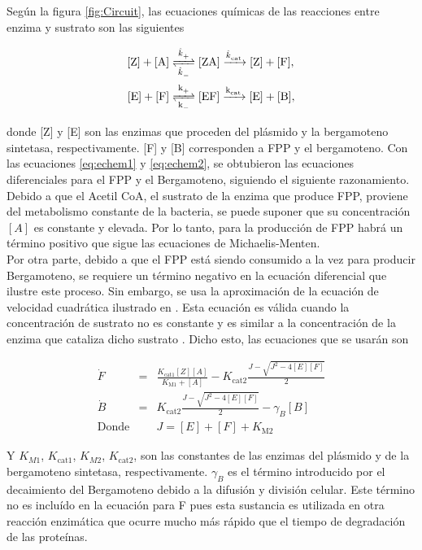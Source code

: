 \documentclass[12pt]{article}
\begin{document}
Seg\'un la figura \ref{fig:Circuit}, las ecuaciones qu\'imicas de las reacciones entre enzima y sustrato son las siguientes

\begin{align}
\ce{[Z] + [A]} &\ce{<=>[\ce{\hat{k}_+}][\ce{\hat{k}_-}] [ZA] ->[\ce{\hat{k}_{cat}}] [Z] + [F]}, \label{eq:echem1}\\
\ce{[E] + [F]} &\ce{<=>[\ce{k_+}][\ce{k_-}] [EF] ->[\ce{k_{cat}}] [E] + [B]}, \label{eq:echem2}
\end{align}

donde [Z] y [E] son las enzimas que proceden del pl\'asmido y la bergamoteno sintetasa, respectivamente. [F] y [B] corresponden a FPP y el bergamoteno. Con las ecuaciones \ref{eq:echem1} y \ref{eq:echem2}, se obtubieron las ecuaciones diferenciales para el FPP y el Bergamoteno, siguiendo el siguiente razonamiento.\\
Debido a que el Acetil CoA, el sustrato de la enzima que produce FPP, proviene del metabolismo constante de la bacteria, se puede suponer que su concentraci\'on $[A]$ es constante y elevada. Por lo tanto, para la producci\'on de FPP habr\'a un t\'ermino positivo que sigue las ecuaciones de Michaelis-Menten.\\
Por otra parte, debido a que el FPP est\'a siendo consumido a la vez para producir Bergamoteno, se requiere un t\'ermino negativo en la ecuaci\'on diferencial que ilustre este proceso. Sin embargo, se usa la aproximaci\'on de la ecuaci\'on de velocidad cuadr\'atica ilustrado en \cite{chemwiki1}. Esta ecuaci\'on es v\'alida cuando la concentraci\'on de sustrato no es constante y es similar a la concentraci\'on de la enzima que cataliza dicho sustrato \cite{chemwiki1}. Dicho esto, las ecuaciones que se usar\'an son

\begin{eqnarray}
\dot{F} &=& \frac{K_{\text{cat1}}[Z][A]}{K_{\text{M1}}+[A]} - K_{\text{cat2}}\frac{J-\sqrt{J^2-4[E][F]}}{2} \label{eq:DiffF}\\
\dot{B} &=& K_{\text{cat2}}\frac{J-\sqrt{J^2-4[E][F]}}{2} - \gamma_B [B] \label{eq:DiffB}\\
\text{Donde} && J=[E]+[F]+K_{\text{M2}} \nonumber
\end{eqnarray}

Y $K_{M1}$, $K_{\text{cat}1}$, $K_{M2}$, $K_{\text{cat}2}$, son las constantes de las enzimas del pl\'asmido y de la bergamoteno sintetasa, respectivamente. $\gamma_B$ es el t\'ermino introducido por el decaimiento del Bergamoteno debido a la difusi\'on y divisi\'on celular. Este t\'ermino no es inclu\'ido en la ecuaci\'on para F pues esta sustancia es utilizada en otra reacci\'on enzim\'atica que ocurre mucho m\'as r\'apido que el tiempo de degradaci\'on de las prote\'inas.\\
\end{document}
